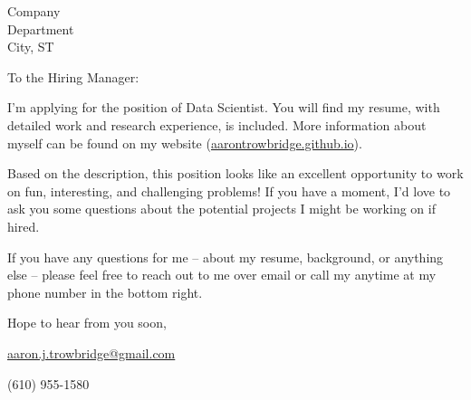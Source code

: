 \documentclass{letter}
\newcommand{\position}   {Data Scientist}
\newcommand{\company}    {Company}
\newcommand{\department} {Department}
\newcommand{\city}       {City, ST}
\begin{document}
\begin{letter}{\company \\ \department \\ \city}

\opening{To the Hiring Manager:}

I'm applying for the position of \position. You will find my resume, with detailed work and research experience, is included.  More information about myself can be found on my website (\href{https://aarontrowbridge.github.io/}{aarontrowbridge.github.io}).

Based on the description, this position looks like an excellent opportunity to work on fun, interesting, and challenging problems! If you have a moment, I'd love to ask you some questions about the potential projects I might be working on if hired.

If you have any questions for me -- about my resume, background, or anything else -- please feel free to reach out to me over email or call my anytime at my phone number in the bottom right.  

\closing{Hope to hear from you soon,}

\vfill 

\hfill \href{mailto:aaron.j.trowbridge@gmail.com}{aaron.j.trowbridge@gmail.com} 

\hfill (610) 955-1580

\end{letter}
\end{document}
